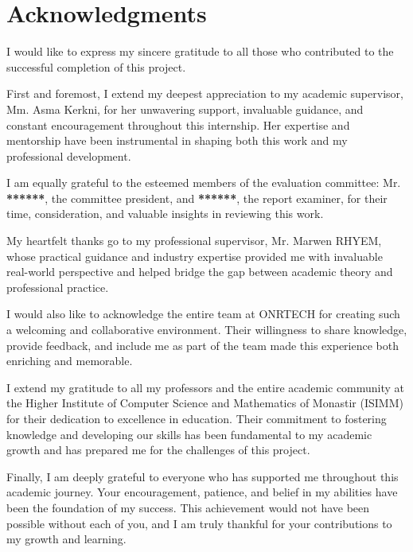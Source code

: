 \chapter*{Acknowledgments}

I would like to express my sincere gratitude to all those who contributed to the successful completion of this project.

First and foremost, I extend my deepest appreciation to my academic supervisor, Mm. Asma Kerkni, for her unwavering support, invaluable guidance, and constant encouragement throughout this internship. Her expertise and mentorship have been instrumental in shaping both this work and my professional development.

I am equally grateful to the esteemed members of the evaluation committee: Mr. \textbf{******}, the committee president, and \textbf{******}, the report examiner, for their time, consideration, and valuable insights in reviewing this work.

My heartfelt thanks go to my professional supervisor, Mr. Marwen RHYEM, whose practical guidance and industry expertise provided me with invaluable real-world perspective and helped bridge the gap between academic theory and professional practice.

I would also like to acknowledge the entire team at ONRTECH for creating such a welcoming and collaborative environment. Their willingness to share knowledge, provide feedback, and include me as part of the team made this experience both enriching and memorable.

I extend my gratitude to all my professors and the entire academic community at the Higher Institute of Computer Science and Mathematics of Monastir (ISIMM) for their dedication to excellence in education. Their commitment to fostering knowledge and developing our skills has been fundamental to my academic growth and has prepared me for the challenges of this project.

Finally, I am deeply grateful to everyone who has supported me throughout this academic journey. Your encouragement, patience, and belief in my abilities have been the foundation of my success. This achievement would not have been possible without each of you, and I am truly thankful for your contributions to my growth and learning.